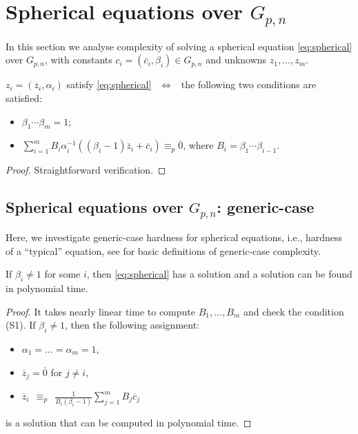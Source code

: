 \documentclass{jgcc}
\def\ovc{{\overline{c}}}
\def\ovo{{\overline{0}}}
\def\ovz{{\overline{z}}}
\begin{document}
\section{Spherical equations over $G_{p,n}$}

In this section we analyse complexity of solving a spherical equation
\eqref{eq:spherical}
over $G_{p,n}$, with constants $c_i=(\ovc_i,\beta_i)\in G_{p,n}$ 
and unknowns $z_1,\dots, z_m$.

\begin{lem}\label{le:main-conditions}
$z_i=(\ovz_i,\alpha_i)$ satisfy 
\eqref{eq:spherical}
$\ \ \Leftrightarrow\ \ $
the following two conditions are satisfied:
\begin{itemize}
\item[(S1)]
$\beta_1\cdots\beta_m=1$;
\item[(S2)]
$\sum_{i=1}^m
B_i\alpha_i^{-1}
((\beta_i-1) \ovz_i+\ovc_i)
\equiv_p \ovo$,
where $B_i=\beta_1\cdots\beta_{i-1}$.
\end{itemize}
\end{lem}

\begin{proof}
Straightforward verification.
\end{proof}


\subsection{Spherical equations over $G_{p,n}$: generic-case}

Here, we investigate generic-case hardness for spherical equations,
i.e., hardness of a ``typical'' equation, see \cite[Chapter 10]{MSU_book:2011} 
for basic definitions of generic-case complexity.

\begin{prop}\label{pr:beta-ne-one}
If $\beta_i\ne 1$ for some $i$, then \eqref{eq:spherical} has a solution 
and a solution can be found in polynomial time.
\end{prop}

\begin{proof}
It takes nearly linear time to compute $B_1,\dots,B_m$ and check 
the condition (S1).
If $\beta_i\ne 1$, then the following assignment:
\begin{itemize}
\item 
$\alpha_1=\dots=\alpha_m=1$,
\item 
$\ovz_j=\ovo$ for $j\ne i$,
\item 
$
\ovz_i
\ \ \equiv_p\ \ 
\tfrac{1}{B_i (\beta_i-1)}
\sum_{j=1}^m B_j \ovc_j
$
\end{itemize}
is a solution that can be computed in polynomial time.
\end{proof}
\end{document}

